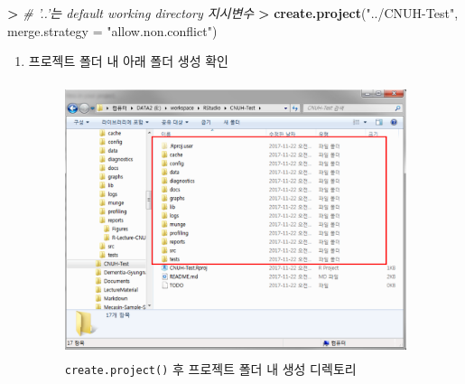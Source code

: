 \documentclass[11pt,a4paper]{book}
\newenvironment{Shaded}{\begin{snugshade}}{\end{snugshade}}
\newcommand{\KeywordTok}[1]{\textcolor[rgb]{0.13,0.29,0.53}{\textbf{#1}}}
\newcommand{\DataTypeTok}[1]{\textcolor[rgb]{0.13,0.29,0.53}{#1}}
\newcommand{\StringTok}[1]{\textcolor[rgb]{0.31,0.60,0.02}{#1}}
\newcommand{\CommentTok}[1]{\textcolor[rgb]{0.56,0.35,0.01}{\textit{#1}}}
\newcommand{\OperatorTok}[1]{\textcolor[rgb]{0.81,0.36,0.00}{\textbf{#1}}}
\newcommand{\ErrorTok}[1]{\textcolor[rgb]{0.64,0.00,0.00}{\textbf{#1}}}
\newcommand{\NormalTok}[1]{#1}
\providecommand{\tightlist}{%
  \setlength{\itemsep}{0pt}\setlength{\parskip}{0pt}}
\theoremstyle{definition}
\theoremstyle{definition}
\theoremstyle{definition}
\theoremstyle{remark}
\begin{document}
\begin{Shaded}
\begin{Highlighting}[]
\OperatorTok{>}\StringTok{ }\CommentTok{# '..'는 default working directory 지시변수}
\ErrorTok{>}\StringTok{ }\KeywordTok{create.project}\NormalTok{(}\StringTok{"../CNUH-Test"}\NormalTok{, }\DataTypeTok{merge.strategy =} \StringTok{"allow.non.conflict"}\NormalTok{)}
\end{Highlighting}
\end{Shaded}

\normalsize

\begin{enumerate}
\def\labelenumi{\arabic{enumi})}
\setcounter{enumi}{3}
\tightlist
\item
  프로젝트 폴더 내 아래 폴더 생성 확인

  \begin{figure}[H] {
    \centering 
    \includegraphics[width = 10cm, height = 8cm]{Figures/R-projecttemplate-01.png}
    \caption[\texttt{create.project()} 후 프로젝트 폴더 내 생성 디렉토리]{\texttt{create.project()} 후 프로젝트 폴더 내 생성 디렉토리}\label{fig:RStudio-projtemp-01}
  } \end{figure}


\end{enumerate}
\end{document}

